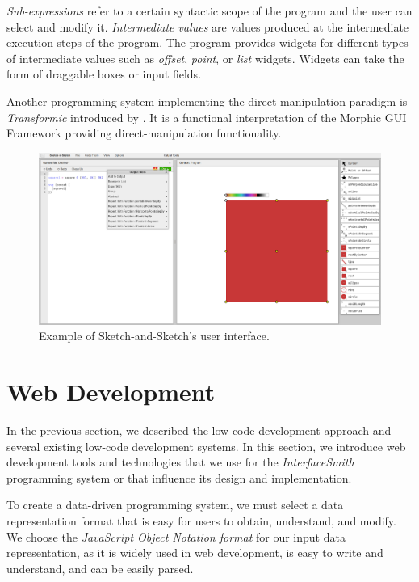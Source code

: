 \emph{Sub-expressions} refer to a certain syntactic scope of the program and the user can select and modify it.
\emph{Intermediate values} are values produced at the intermediate execution steps of the program.
The program provides widgets for different types of intermediate values such as \emph{offset}, \emph{point}, or \emph{list} widgets.
Widgets can take the form of draggable boxes or input fields.

Another programming system implementing the direct manipulation paradigm is \emph{Transformic} introduced by \citet{Schreiber_Krahn_Ingalls_Hirschfeld_2017}.
It is a functional interpretation of the Morphic GUI Framework providing direct-manipulation functionality.

\begin{figure}[htbp]
	\centering
	\includegraphics[width=1\linewidth]{img/sketch.pdf}
	\caption{Example of Sketch-and-Sketch's user interface. }
	\label{fig:sketch}
\end{figure}

\section{Web Development}
In the previous section, we described the low-code development approach and several existing low-code development systems.
In this section, we introduce web development tools and technologies that we use for the \emph{InterfaceSmith} programming system or that influence its design and implementation.

To create a data-driven programming system, we must select a data representation format that is easy for users to obtain, understand, and modify.
We choose the \emph{JavaScript Object Notation format} for our input data representation, as it is widely used in web development, is easy to write and understand, and can be easily parsed.

